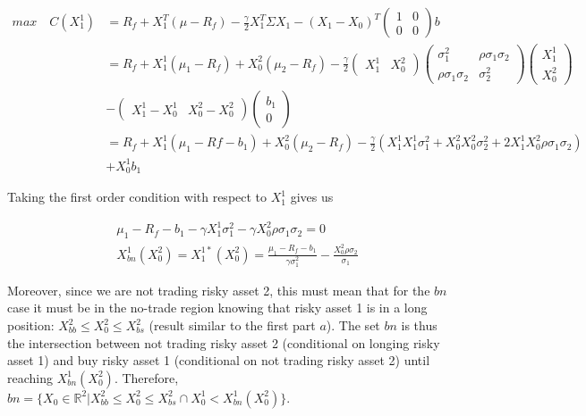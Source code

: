\documentclass[10pt]{article}
\begin{document}
\begin{align*}
	max \quad C(X_1^1) &= R_f + X_1^T(\mu - R_f) - \frac{\gamma}{2}X_1^T\Sigma X_1 - (X_1 - X_0)^T \begin{pmatrix}
	1 & 0\\	
	0 & 0
\end{pmatrix} b \\
&= R_f + X_1^1(\mu_1 - R_f) + X_0^2(\mu_2 - R_f) - \frac{\gamma}{2}  \begin{pmatrix}
	X_1^1 & X_0^2
\end{pmatrix} \begin{pmatrix}
	\sigma_1^2 & \rho \sigma_1 \sigma_2\\	
	\rho \sigma_1 \sigma_2 & \sigma_2^2
\end{pmatrix} \begin{pmatrix}
	X_1^1 \\	
	X_0^2 
\end{pmatrix} \\
& - \begin{pmatrix}
	X_1^1 - X_0^1 & X_0^2 - X_0^2
\end{pmatrix} \begin{pmatrix}
	b_1 \\	
	0 
\end{pmatrix}\\
&= R_f + X_1^1(\mu_1 - Rf - b_1) + X_0^2(\mu_2 - R_f) - \frac{\gamma}{2}\left( X_1^1 X_1^1 \sigma_1^2 + X_0^2 X_0^2 \sigma_2^2 + 2 X_1^1X_0^2\rho \sigma_1 \sigma_2 \right)\\
	& + X_0^1b_1
\end{align*}

Taking the first order condition with respect to $X_1^1$ gives us

\begin{align*}
	& \mu_1 - R_f - b_1 - \gamma X_1^1\sigma_1^2 - \gamma X_0^2 \rho \sigma_1 \sigma_2 = 0	\\
	& X_{bn}^1(X_0^2) =  X_1^{1*}(X_0^2)  = \frac{\mu_1 - R_f - b_1}{\gamma \sigma_1^2} - \frac{X_0^2 \rho  \sigma_2}{\sigma_1} 
\end{align*}

Moreover, since we are not trading risky asset 2, this must mean that for the  $bn$ case it must be in the no-trade region knowing that risky asset 1 is in a long position: $X_{bb}^2 \leq X_0^2 \leq X_{bs}^2$ (result similar to the first part $a$). The  set $bn $ is thus the intersection between not trading risky asset 2 (conditional on longing risky asset 1) and buy risky asset 1 (conditional on not trading risky asset 2) until reaching $X_{bn}^1(X_0^2)$. Therefore, $bn = \{ X_0 \in \mathbb{R}^2 \vert X_{bb}^2 \leq X_0^2 \leq X_{bs}^2 \cap X_0^1 < X_{bn}^1(X_0^2) \}$.
\end{document}
